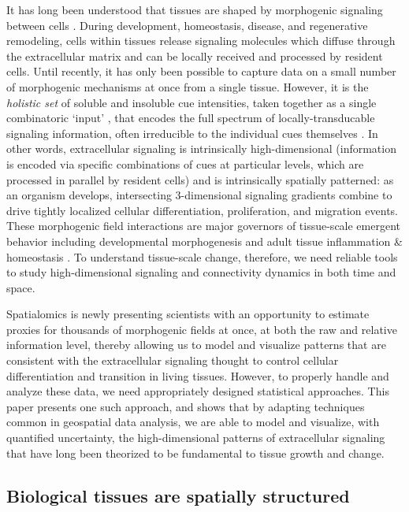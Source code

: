 \documentclass[10pt,letterpaper]{article}
\begin{document}
It has long been understood that tissues are shaped by morphogenic signaling between cells \cite{Vainio1997,Basson2012,Hagolani2019,Wu2023}. During development, homeostasis, disease, and regenerative remodeling, cells within tissues release signaling molecules which diffuse through the extracellular matrix and can be locally received and processed by resident cells. Until recently, it has only been possible to capture data on a small number of morphogenic mechanisms at once from a single tissue. However, it is the \textit{holistic set} of soluble and insoluble cue intensities, taken together as a single combinatoric `input' \cite{Li2019,Klumpe2022,Granados2024}, that encodes the full spectrum of locally-transducable signaling information, often irreducible to the individual cues themselves \cite{Brennan2012,Ellison2016,Scuderi2025}. In other words, extracellular signaling is intrinsically high-dimensional (information is encoded via specific combinations of cues at particular levels, which are processed in parallel by resident cells) and is intrinsically spatially patterned: as an organism develops, intersecting 3-dimensional signaling gradients combine to drive tightly localized cellular differentiation, proliferation, and migration events. These morphogenic field interactions are major governors of tissue-scale emergent behavior including developmental morphogenesis and adult tissue inflammation \& homeostasis \cite{Weaver1997,Hironaka2012,Meizlish2021,Kicheva2023}. To understand tissue-scale change, therefore, we need reliable tools to study high-dimensional signaling and connectivity dynamics in both time and space.

Spatialomics is newly presenting scientists with an opportunity to estimate proxies for thousands of morphogenic fields at once, at both the raw and relative information level, thereby allowing us to model and visualize patterns that are consistent with the extracellular signaling thought to control cellular differentiation and transition in living tissues. However, to properly handle and analyze these data, we need appropriately designed statistical approaches. This paper presents one such approach, and shows that by adapting techniques common in geospatial data analysis, we are able to model and visualize, with quantified uncertainty, the high-dimensional patterns of extracellular signaling that have long been theorized to be fundamental to tissue growth and change.

\subsection*{Biological tissues are spatially structured}
\end{document}
